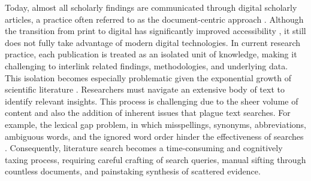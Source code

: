 
Today, almost all scholarly findings are communicated through digital scholarly articles, a practice often referred to as the document-centric approach \cite{jaradeh_open_2019-1,auer_towards_2018}. Although the transition from print to digital has significantly improved accessibility \cite{sompel_all_2009,bosman_scholarly_2017}, it still does not fully take advantage of modern digital technologies. In current research practice, each publication is treated as an isolated unit of knowledge, making it challenging to interlink related findings, methodologies, and underlying data. This isolation becomes especially problematic given the exponential growth of scientific literature \cite{bornmann_growth_2021}. Researchers must navigate an extensive body of text to identify relevant insights. This process is challenging due to the sheer volume of content and also the addition of inherent issues that plague text searches. For example, the lexical gap problem, in which misspellings, synonyms, abbreviations, ambiguous words, and the ignored word order hinder the effectiveness of searches \cite{li_unsupervised_2022}. Consequently, literature search becomes a time-consuming and cognitively taxing process, requiring careful crafting of search queries, manual sifting through countless documents, and painstaking synthesis of scattered evidence. 

